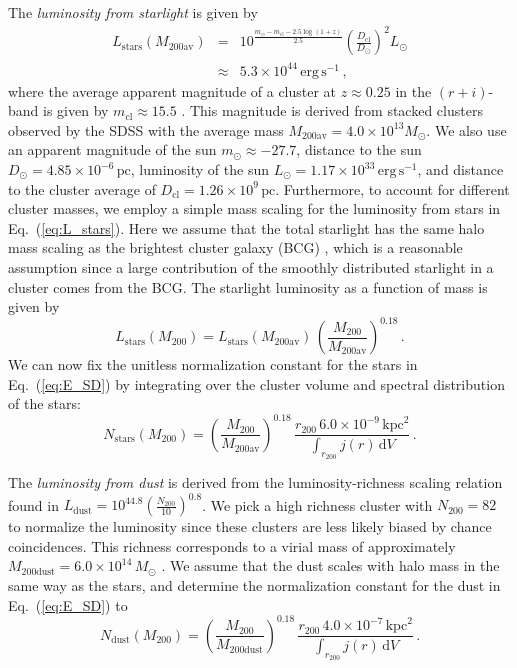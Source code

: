 \documentclass[10pt,aps,pra,reprint,amsmath,amsfonts,amssymb,showpacs,nofootinbib,floatfix]{revtex4-1}
\newcommand{\rmn}{\mathrm}
\newcommand{\clu}{\rmn{cl}}
\newcommand{\msun}{M_\odot}
\newcommand{\stars}{\rmn{stars}}
\newcommand{\dust}{\rmn{dust}}
\newcommand{\kpc}{\rmn{kpc}}
\newcommand{\dd}{\rmn{d}}
\newcommand{\rvir}{r_{200}}
\newcommand{\mvir}{M_{200}}
\begin{document}
{The {\em luminosity from starlight} is given by
\begin{eqnarray}
L_\stars(M_{200\rmn{av}})&=&10^{\frac{m_\odot-m_\rmn{cl}-2.5\log\left(1+z\right)}{2.5}}
\left(\frac{D_\clu}{D_\odot}\right)^2 L_\odot\nonumber\\
&\approx& 5.3\times10^{44}\,\rmn{erg}\,\rmn{s}^{-1}\,,
\label{eq:L_stars}
\end{eqnarray}
where the average apparent magnitude of a cluster at $z\approx 0.25$
in the $(r+i)$-band is given by $m_\rmn{cl}\approx 15.5$
\cite{2005MNRAS.358..949Z}. This magnitude is derived from stacked
clusters observed by the SDSS with the average mass
$M_{200\rmn{av}}=4.0\times10^{13}\msun$. We also use an apparent
magnitude of the sun $m_\odot\approx -27.7$, distance to the sun
$D_\odot=4.85\times10^{-6}\,\rmn{pc}$, luminosity of the sun
$L_\odot=1.17\times10^{33}\,\rmn{erg\,s}^{-1}$, and distance to the
cluster average of $D_\clu=1.26\times10^9\,\rmn{pc}$. Furthermore, to account for
different cluster masses, we employ a simple mass scaling for the
luminosity from stars in Eq.~(\ref{eq:L_stars}). Here we assume
that the total starlight has the same halo mass scaling as the
brightest cluster galaxy (BCG) \cite{2010ApJ...713.1037H}, which is a
reasonable assumption since a large contribution of the smoothly distributed
starlight in a cluster comes from the BCG. The starlight luminosity as
a function of mass is given by
\begin{equation}
L_\stars(\mvir)=L_\stars(M_{200\rmn{av}})\,
\left(\frac{\mvir}{M_{200\rmn{av}}}\right)^{0.18}\,.
\label{eq:L_stars_m}
\end{equation}
We can now fix the unitless normalization constant for the stars in
Eq.~(\ref{eq:E_SD}) by integrating over the cluster volume and
spectral distribution of the stars:
\begin{equation}
 N_\stars(\mvir) =
\left(\frac{\mvir}{M_{200\rmn{av}}}\right)^{0.18}\,
\frac{\rvir\, 6.0\times10^{-9}\,\kpc^2}{\int_{\rvir} j(r) \,\dd V}\,.
\label{eq:N_stars}
\end{equation}

The {\em luminosity from dust} is derived from the
luminosity-richness scaling relation found in
\cite{2008A&A...490..547G}
$L_\dust=10^{44.8}\left(\frac{N_{200}}{10}\right)^{0.8}$. We pick a
high richness cluster with $N_{200}=82$ to normalize the luminosity
since these clusters are less likely biased by chance
coincidences. This richness corresponds to a virial mass of approximately
$M_\rmn{200dust}=6.0\times10^{14}\,\msun$
\cite{2010ApJ...713.1037H}. We assume that the dust scales with halo
mass in the same way as the stars, and determine the normalization
constant for the dust in Eq.~(\ref{eq:E_SD}) to
\begin{equation}
 N_\dust(\mvir) =
\left(\frac{\mvir}{M_\rmn{200dust}}\right)^{0.18}\,
\frac{\rvir\,4.0\times10^{-7}\,\kpc^2}{\int_{\rvir} j(r) \,\dd V}\,.
\label{eq:N_dust}
\end{equation}


}
\end{document}
